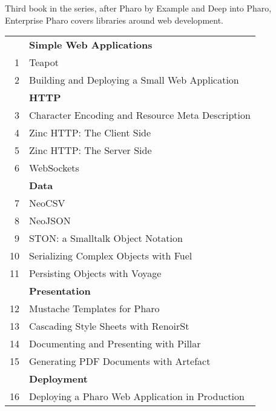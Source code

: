 \documentclass[11pt,english,oneside]{../support/latex/sbabook/sbabook}
\begin{document}
\sffamily
\pagestyle{titlingpage}
\thispagestyle{titlingpage} %

Third book in the series, after Pharo by Example and Deep into Pharo, \\
Enterprise Pharo covers libraries around web development.

\begin{tabular}{@{\quad}r@{\quad}l@{}}
   & \textbf{Simple Web Applications}                 \\
1  & Teapot                                           \\
2  & Building and Deploying a Small Web Application   \\[\smallskipamount]
   & \textbf{HTTP}                                    \\
3  & Character Encoding and Resource Meta Description \\
4  & Zinc HTTP: The Client Side                       \\
5  & Zinc HTTP: The Server Side                       \\
6  & WebSockets                                       \\[\smallskipamount]
   & \textbf{Data}                                    \\
7  & NeoCSV                                           \\
8  & NeoJSON                                          \\
9  & STON: a Smalltalk Object Notation                \\
10 & Serializing Complex Objects with Fuel            \\
11 & Persisting Objects with Voyage                   \\[\smallskipamount]
   & \textbf{Presentation}                            \\
12 & Mustache Templates for Pharo                     \\
13 & Cascading Style Sheets with RenoirSt             \\
14 & Documenting and Presenting with Pillar           \\
15 & Generating PDF Documents with Artefact           \\[\smallskipamount]
   & \textbf{Deployment}                              \\
16 & Deploying a Pharo Web Application in Production  \\
\end{tabular}
\end{document}
